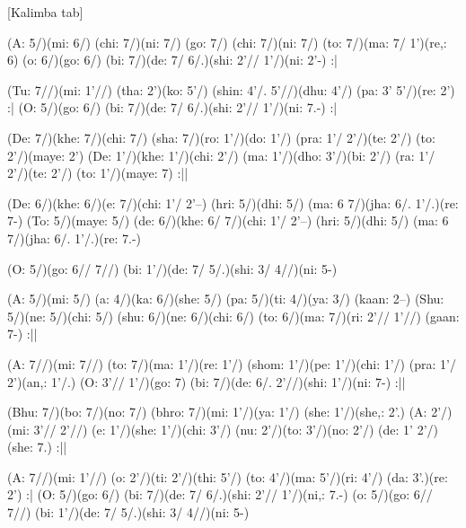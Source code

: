 \documentclass[11pt]{article}
\begin{document}
[Kalimba tab]
\begin{jianpu}
(A: 5/)(mi: 6/) (chi: 7/)(ni: 7/) (go: 7/) (chi: 7/)(ni: 7/) (to: 7/)(ma: 7/ 1')(re,: 6) (o: 6/)(go: 6/) (bi: 7/)(de: 7/ 6/.)(shi: 2'// 1'/)(ni: 2'-) :|

(Tu: 7//)(mi: 1'//) (tha: 2')(ko: 5'/) (shin: 4'/. 5'//)(dhu: 4'/) (pa: 3' 5'/)(re: 2') :|
(O: 5/)(go: 6/) (bi: 7/)(de: 7/ 6/.)(shi: 2'// 1'/)(ni: 7.-) :|

(De: 7/)(khe: 7/)(chi: 7/) (sha: 7/)(ro: 1'/)(do: 1'/) (pra: 1'/ 2'/)(te: 2'/) (to: 2'/)(maye: 2')
(De: 1'/)(khe: 1'/)(chi: 2'/) (ma: 1'/)(dho: 3'/)(bi: 2'/) (ra: 1'/ 2'/)(te: 2'/) (to: 1'/)(maye: 7) :||

(De: 6/)(khe: 6/)(e: 7/)(chi: 1'/ 2'--) (hri: 5/)(dhi: 5/) (ma: 6 7/)(jha: 6/. 1'/.)(re: 7-)
(To: 5/)(maye: 5/) (de: 6/)(khe: 6/ 7/)(chi: 1'/ 2'--) (hri: 5/)(dhi: 5/) (ma: 6 7/)(jha: 6/. 1'/.)(re: 7.-)

(O: 5/)(go: 6// 7//) (bi: 1'/)(de: 7/ 5/.)(shi: 3/ 4//)(ni: 5-)

(A: 5/)(mi: 5/) (a: 4/)(ka: 6/)(she: 5/) (pa: 5/)(ti: 4/)(ya: 3/) (kaan: 2--)
(Shu: 5/)(ne: 5/)(chi: 5/) (shu: 6/)(ne: 6/)(chi: 6/) (to: 6/)(ma: 7/)(ri: 2'// 1'//) (gaan: 7-) :||

(A: 7//)(mi: 7//) (to: 7/)(ma: 1'/)(re: 1'/) (shom: 1'/)(pe: 1'/)(chi: 1'/) (pra: 1'/ 2')(an,: 1'/.)
(O: 3'// 1'/)(go: 7) (bi: 7/)(de: 6/. 2'//)(shi: 1'/)(ni: 7-) :||

(Bhu: 7/)(bo: 7/)(no: 7/) (bhro: 7/)(mi: 1'/)(ya: 1'/) (she: 1'/)(she,: 2'.)
(A: 2'/)(mi: 3'// 2'//) (e: 1'/)(she: 1'/)(chi: 3'/) (nu: 2'/)(to: 3'/)(no: 2'/) (de: 1' 2'/)(she: 7.) :||

(A: 7//)(mi: 1'//) (o: 2'/)(ti: 2'/)(thi: 5'/) (to: 4'/)(ma: 5'/)(ri: 4'/) (da: 3'.)(re: 2') :|
(O: 5/)(go: 6/) (bi: 7/)(de: 7/ 6/.)(shi: 2'// 1'/)(ni,: 7.-) (o: 5/)(go: 6// 7//) (bi: 1'/)(de: 7/ 5/.)(shi: 3/ 4//)(ni: 5-)
\end{jianpu}
\end{document}

